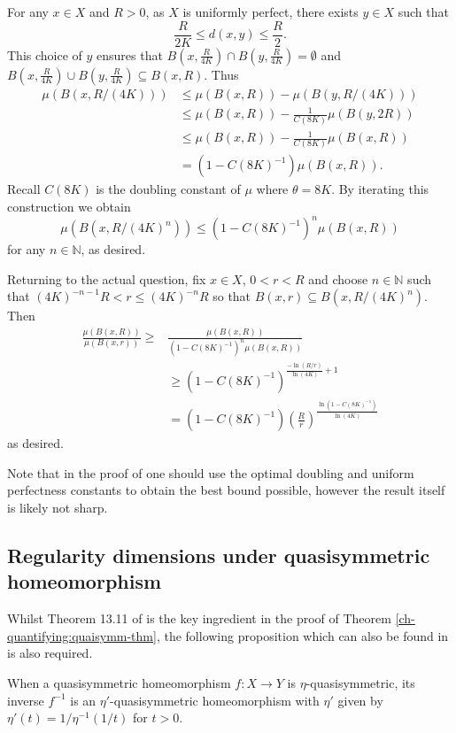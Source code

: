 For any $x\in X$ and $R>0$, as $X$ is uniformly perfect, there exists $y \in X$ such that $$\frac{R}{2K} \le d(x,y) \le \frac{R}{2}.$$ This choice of $y$ ensures that $B(x,\frac{R}{4K}) \cap B(y,\frac{R}{4K}) = \emptyset $ and $B(x,\frac{R}{4K}) \cup B(y,\frac{R}{4K}) \subseteq B(x,R)$. Thus
\begin{align*}
\mu(B(x,R/(4K))) &\le \mu(B(x,R)) - \mu(B(y, R/(4K)))\\
& \le \mu(B(x,R)) - \frac{1}{C(8K)}\mu(B(y,2R)) \\
& \le \mu(B(x,R)) - \frac{1}{C(8K)}\mu(B(x,R)) \\
& = (1-C(8K)^{-1}) \mu(B(x,R)).
\end{align*}
Recall $C(8K)$ is the doubling constant of $\mu$ where $\theta = 8K$. By iterating this construction we obtain
\[
\mu(B(x,R/(4K)^n)) \le (1-C(8K)^{-1})^n \mu(B(x,R))
\]
for any $n\in \mathbb{N}$, as desired.
	
Returning to the actual question, fix $x\in X$, $0 < r < R$ and choose $n\in \mathbb{N}$ such that $(4K)^{-n-1}R < r \le (4K)^{-n}R$ so that $B(x,r) \subseteq B(x,R/(4K)^{n})$. Then
\begin{align*}
\frac{\mu(B(x,R))}{\mu(B(x,r))} \ge& \frac{\mu(B(x,R))}{(1-C(8K)^{-1})^n\mu(B(x,R))} \\
& \ge (1-C(8K)^{-1})^{\frac{-\ln(R/r)}{\ln(4K)} + 1}\\
& = (1-C(8K)^{-1})\left(\frac{R}{r}\right)^{\frac{\ln(1-C(8K)^{-1})}{\ln(4K)}}
\end{align*}
as desired.
	
Note that in the proof of \cite{gromov} one should use the optimal doubling and uniform perfectness constants to obtain the best bound possible, however the result itself is likely not sharp.






\subsection{Regularity dimensions under quasisymmetric homeomorphism}\label{ch-quantifying:proof-quasi}


Whilst Theorem 13.11 of \cite{heinonen} is the key ingredient in the proof of Theorem \ref{ch-quantifying:quaisymm-thm}, the following proposition which can also be found in \cite{heinonen} is also required.

\begin{proposition}
	When a quasisymmetric homeomorphism $f\colon X \rightarrow Y$ is $\eta$-quasisymmetric, its inverse $f^{-1}$ is an $\eta'$-quasisymmetric homeomorphism with $\eta'$ given by  $\eta'(t) = 1/\eta^{-1}(1/t)$ for $t>0$.
\end{proposition}

